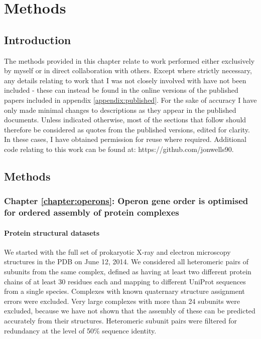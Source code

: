 \documentclass[a4paper,11pt,twoside,openright]{scrbook}
\begin{document}
\chapter{Methods}\label{chapter:methods}

\section{Introduction}
The methods provided in this chapter relate to work performed either exclusively by myself or in direct collaboration with others. Except where strictly necessary, any details relating to work that I was not closely involved with have not been included - these can instead be found in the online versions of the published papers included in appendix \ref{appendix:published}. For the sake of accuracy I have only made minimal changes to descriptions as they appear in the published documents. Unless indicated otherwise, most of the sections that follow should therefore be considered as quotes from the published versions, edited for clarity. In these cases, I have obtained permission for reuse where required. Additional code relating to this work can be found at: https://github.com/jonwells90.

\section{Methods}

\subsection{Chapter \ref*{chapter:operons}: Operon gene order is optimised for ordered assembly of protein complexes}

\subsubsection{Protein structural datasets}
We started with the full set of prokaryotic X-ray and electron microscopy structures in the PDB on June 12, 2014. We considered all heteromeric pairs of subunits from the same complex, defined as having at least two different protein chains of at least 30 residues each and mapping to different UniProt sequences from a single species. Complexes with known quaternary structure assignment errors \cite{Levy2007} were excluded. Very large complexes with more than 24 subunits were excluded, because we have not shown that the assembly of these can be predicted accurately from their structures. Heteromeric subunit pairs were filtered for redundancy at the level of 50\% sequence identity.
\end{document}
